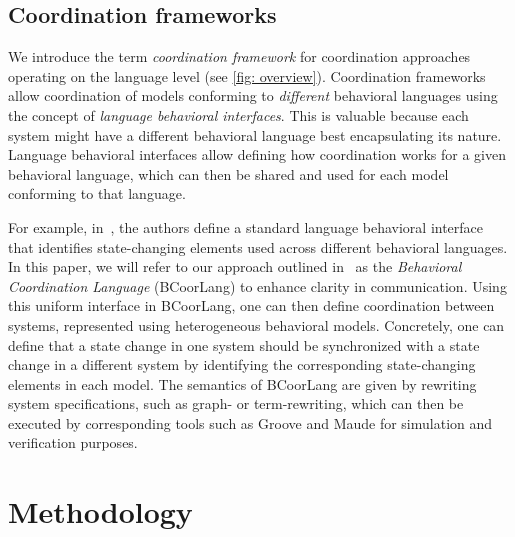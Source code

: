 \documentclass[runningheads]{llncs}
\begin{document}
\subsection{Coordination frameworks} \label{subsec: frameworks}
We introduce the term \textit{coordination framework} for coordination approaches operating on the language level (see \autoref{fig: overview}).
Coordination frameworks allow coordination of models conforming to \textit{different} behavioral languages using the concept of \textit{language behavioral interfaces}.
This is valuable because each system might have a different behavioral language best encapsulating its nature.
Language behavioral interfaces allow defining how coordination works for a given behavioral language, which can then be shared and used for each model conforming to that language.

For example, in~\cite{krauterBehavioralConsistencyMultimodeling2023}, the authors define a standard language behavioral interface that identifies state-changing elements used across different behavioral languages.
In this paper, we will refer to our approach outlined in~\cite{krauterBehavioralConsistencyMultimodeling2023} as the \textit{Behavioral Coordination Language} (BCoorLang) to enhance clarity in communication.
Using this uniform interface in BCoorLang, one can then define coordination between systems, represented using heterogeneous behavioral models.
Concretely, one can define that a state change in one system should be synchronized with a state change in a different system by identifying the corresponding state-changing elements in each model.
The semantics of BCoorLang are given by rewriting system specifications, such as graph- or term-rewriting, which can then be executed by corresponding tools such as Groove \cite{rensinkGROOVESimulatorTool2004} and Maude \cite{manuelclavelAllMaudeHighPerformance2007} for simulation and verification purposes.

\section{Methodology} \label{sec: methodology}
\end{document}
